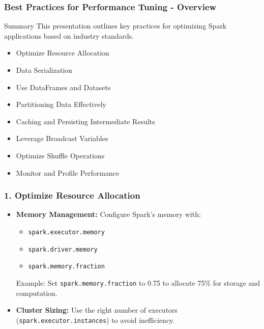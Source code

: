 \documentclass[aspectratio=169]{beamer}
\begin{document}
\begin{frame}[fragile]
    \frametitle{Best Practices for Performance Tuning - Overview}
    \begin{block}{Summary}
        This presentation outlines key practices for optimizing Spark applications based on industry standards.
    \end{block}
    \begin{itemize}
        \item Optimize Resource Allocation
        \item Data Serialization
        \item Use DataFrames and Datasets
        \item Partitioning Data Effectively
        \item Caching and Persisting Intermediate Results
        \item Leverage Broadcast Variables
        \item Optimize Shuffle Operations
        \item Monitor and Profile Performance
    \end{itemize}
\end{frame}

\begin{frame}[fragile]
    \frametitle{1. Optimize Resource Allocation}
    \begin{itemize}
        \item \textbf{Memory Management:} 
        Configure Spark’s memory with:
        \begin{itemize}
            \item \texttt{spark.executor.memory}
            \item \texttt{spark.driver.memory}
            \item \texttt{spark.memory.fraction}
        \end{itemize}
        Example: Set \texttt{spark.memory.fraction} to 0.75 to allocate 75\% for storage and computation.
        
        \item \textbf{Cluster Sizing:} 
        Use the right number of executors (\texttt{spark.executor.instances}) to avoid inefficiency.
    \end{itemize}
\end{frame}
\end{document}

